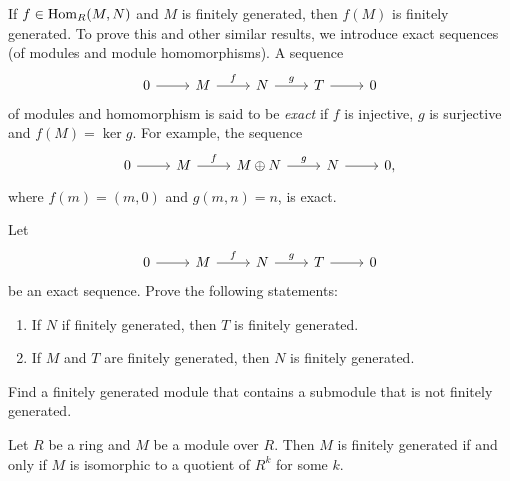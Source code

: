 If $f\in\operatorname{Hom}_R(M,N)$ and $M$ is finitely generated, then 
$f(M)$ is finitely generated. To prove this and other similar results, 
we introduce exact sequences (of modules and module homomorphisms). 
A sequence 
	\begin{equation}
	\label{eq:exacta1}	
    \begin{tikzcd}
	0 & M & N & T & 0
	\arrow[from=1-1, to=1-2]
	\arrow["f", from=1-2, to=1-3]
	\arrow["g", from=1-3, to=1-4]
	\arrow[from=1-4, to=1-5]
    \end{tikzcd}
  	\end{equation}
of modules and homomorphism is said to be \emph{exact} 
if $f$ is injective, $g$ is surjective and $f(M)=\ker g$. For example,
the sequence
\[
\begin{tikzcd}
	0 & M & M\oplus N & N & 0,
	\arrow[from=1-1, to=1-2]
	\arrow["f", from=1-2, to=1-3]
	\arrow["g", from=1-3, to=1-4]
	\arrow[from=1-4, to=1-5]
\end{tikzcd}
\]
where $f(m)=(m,0)$ and $g(m,n)=n$, is exact.

\begin{exercise}
	Let 
\[\begin{tikzcd}
	0 & M & N & T & 0
	\arrow[from=1-1, to=1-2]
	\arrow["f", from=1-2, to=1-3]
	\arrow["g", from=1-3, to=1-4]
	\arrow[from=1-4, to=1-5]
\end{tikzcd}
\]
     be an exact sequence. Prove the following statements: 
     \begin{enumerate}
     \item If $N$ if finitely generated, then $T$ is finitely generated. 
     \item If $M$ and $T$ are finitely generated, then $N$ is finitely generated. 	
     \end{enumerate}
\end{exercise}

\begin{exercise}
\label{xca:submodule_notfg}
Find a finitely generated module that contains a submodule 
that is not finitely generated. 
\end{exercise}

\begin{proposition}
    Let $R$ be a ring and $M$ be a module over $R$. 
    Then $M$ is finitely generated if and only 
    if $M$ is isomorphic to a quotient of $R^k$ for some $k$.
\end{proposition}

